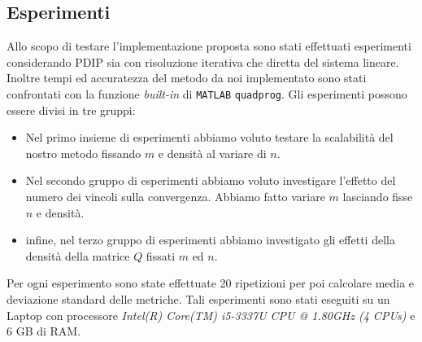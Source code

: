 \subsection{Esperimenti}
Allo scopo di testare l'implementazione proposta sono stati effettuati esperimenti considerando PDIP sia con risoluzione iterativa che diretta del sistema lineare.
Inoltre tempi ed accuratezza del metodo da noi implementato sono stati confrontati con la funzione \textit{built-in} di \texttt{MATLAB} \texttt{quadprog}.
Gli esperimenti possono essere divisi in tre gruppi:
\begin{itemize}
    \item Nel primo insieme di esperimenti abbiamo voluto testare la scalabilità del nostro metodo fissando $m$ e densità al variare di $n$.
    \item Nel secondo gruppo di esperimenti abbiamo voluto investigare l'effetto del numero dei vincoli sulla convergenza.
    Abbiamo fatto variare $m$ lasciando fisse $n$ e densità.
    \item infine, nel terzo gruppo di esperimenti abbiamo investigato gli effetti della densità della matrice $Q$ fissati $m$ ed $n$.
\end{itemize}

Per ogni esperimento sono state effettuate 20 ripetizioni per poi calcolare media e deviazione standard delle metriche.
Tali esperimenti sono stati eseguiti su un Laptop con processore \textit{Intel(R) Core(TM) i5-3337U CPU @ 1.80GHz (4 CPUs)} e 6 GB di RAM. 
